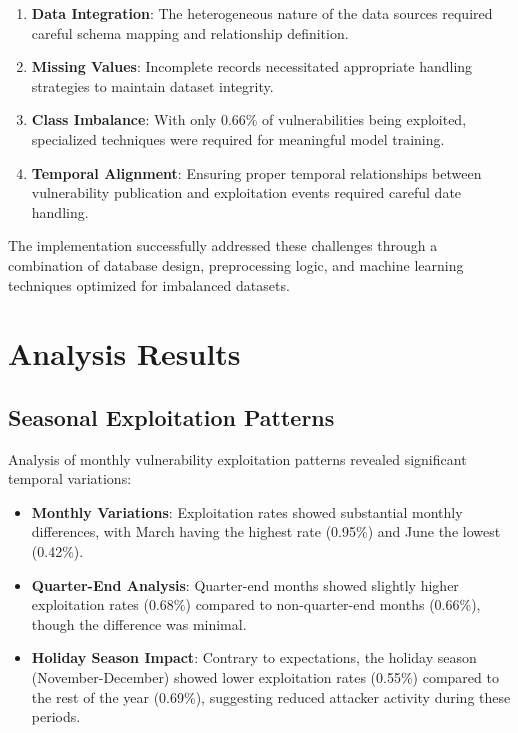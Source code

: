\documentclass[runningheads]{llncs}
\begin{document}
\begin{enumerate}
    \item \textbf{Data Integration}: The heterogeneous nature of the data sources required careful schema mapping and relationship definition.
    
    \item \textbf{Missing Values}: Incomplete records necessitated appropriate handling strategies to maintain dataset integrity.
    
    \item \textbf{Class Imbalance}: With only 0.66\% of vulnerabilities being exploited, specialized techniques were required for meaningful model training.
    
    \item \textbf{Temporal Alignment}: Ensuring proper temporal relationships between vulnerability publication and exploitation events required careful date handling.
\end{enumerate}

The implementation successfully addressed these challenges through a combination of database design, preprocessing logic, and machine learning techniques optimized for imbalanced datasets.

\section{Analysis Results}
\label{sec:results}

\subsection{Seasonal Exploitation Patterns}
Analysis of monthly vulnerability exploitation patterns revealed significant temporal variations:

\begin{itemize}
    \item \textbf{Monthly Variations}: Exploitation rates showed substantial monthly differences, with March having the highest rate (0.95\%) and June the lowest (0.42\%).
    
    \item \textbf{Quarter-End Analysis}: Quarter-end months showed slightly higher exploitation rates (0.68\%) compared to non-quarter-end months (0.66\%), though the difference was minimal.
    
    \item \textbf{Holiday Season Impact}: Contrary to expectations, the holiday season (November-December) showed lower exploitation rates (0.55\%) compared to the rest of the year (0.69\%), suggesting reduced attacker activity during these periods.
\end{itemize}
\end{document}
